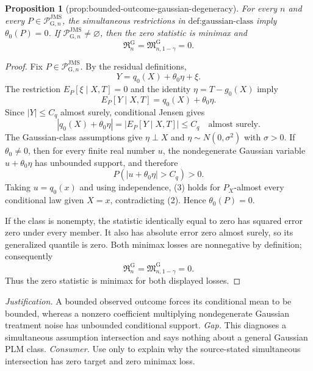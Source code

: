 \documentclass{article}
\newtheorem{proposition}{Proposition}
\begin{document}
\begin{proposition}[prop:bounded-outcome-gaussian-degeneracy]\label{prop:bounded-outcome-gaussian-degeneracy}
For every \(n\) and every \(P\in\mathcal P_{\mathrm G,n}^{\mathrm{JMS}}\), the simultaneous restrictions in \(\text{def:gaussian-class}\) imply \(\theta_0(P)=0\). If \(\mathcal P_{\mathrm G,n}^{\mathrm{JMS}}\neq\varnothing\), then the zero statistic is minimax and
\[
 \mathfrak R_n^{\mathrm G}
 =\mathfrak M_{n,1-\gamma}^{\mathrm G}
 =0.
\]
\end{proposition}
\begin{proof}
Fix \(P\in\mathcal P_{\mathrm G,n}^{\mathrm{JMS}}\). By the residual definitions,
\[
 Y=q_0(X)+\theta_0\eta+\xi.
\]
The restriction \(E_P[\xi\mid X,T]=0\) and the identity \(\eta=T-g_0(X)\) imply
\[
 E_P[Y\mid X,T]=q_0(X)+\theta_0\eta. \tag{1}
\]
Since \(|Y|\le C_q\) almost surely, conditional Jensen gives
\[
 |q_0(X)+\theta_0\eta|
 =|E_P[Y\mid X,T]|\le C_q
 \quad\text{almost surely}. \tag{2}
\]
The Gaussian-class assumptions give \(\eta\perp X\) and \(\eta\sim N(0,\sigma^2)\) with \(\sigma>0\). If \(\theta_0\ne0\), then for every finite real number \(u\), the nondegenerate Gaussian variable \(u+\theta_0\eta\) has unbounded support, and therefore
\[
 P(|u+\theta_0\eta|>C_q)>0. \tag{3}
\]
Taking \(u=q_0(x)\) and using independence, (3) holds for \(P_X\)-almost every conditional law given \(X=x\), contradicting (2). Hence \(\theta_0(P)=0\).

If the class is nonempty, the statistic identically equal to zero has squared error zero under every member. It also has absolute error zero almost surely, so its generalized quantile is zero. Both minimax losses are nonnegative by definition; consequently
\[
 \mathfrak R_n^{\mathrm G}
 =\mathfrak M_{n,1-\gamma}^{\mathrm G}=0.
\]
Thus the zero statistic is minimax for both displayed losses.
\end{proof}
\par\smallskip\noindent \textit{Justification.} A bounded observed outcome forces its conditional mean to be bounded, whereas a nonzero coefficient multiplying nondegenerate Gaussian treatment noise has unbounded conditional support. \textit{Gap.} This diagnoses a simultaneous assumption intersection and says nothing about a general Gaussian PLM class. \textit{Consumer.} Use only to explain why the source-stated simultaneous intersection has zero target and zero minimax loss.
\end{document}
